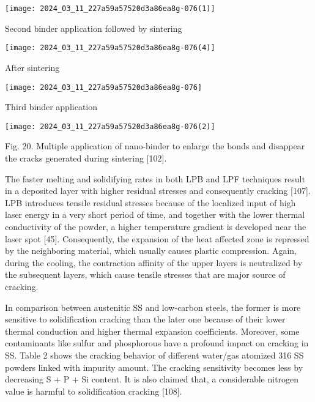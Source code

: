 \documentclass[10pt]{article}
\begin{document}
\begin{center}
\texttt{[image: 2024\_03\_11\_227a59a57520d3a86ea8g-076(1)]}
\end{center}

Second binder application followed by sintering

\begin{center}
\texttt{[image: 2024\_03\_11\_227a59a57520d3a86ea8g-076(4)]}
\end{center}

After sintering

\begin{center}
\texttt{[image: 2024\_03\_11\_227a59a57520d3a86ea8g-076]}
\end{center}

Third binder application

\begin{center}
\texttt{[image: 2024\_03\_11\_227a59a57520d3a86ea8g-076(2)]}
\end{center}

Fig. 20. Multiple application of nano-binder to enlarge the bonds and disappear the cracks generated during sintering [102].

The faster melting and solidifying rates in both LPB and LPF techniques result in a deposited layer with higher residual stresses and consequently cracking [107]. LPB introduces tensile residual stresses because of the localized input of high laser energy in a very short period of time, and together with the lower thermal conductivity of the powder, a higher temperature gradient is developed near the laser spot [45]. Consequently, the expansion of the heat affected zone is repressed by the neighboring material, which usually causes plastic compression. Again, during the cooling, the contraction affinity of the upper layers is neutralized by the subsequent layers, which cause tensile stresses that are major source of cracking.

In comparison between austenitic SS and low-carbon steels, the former is more sensitive to solidification cracking than the later one because of their lower thermal conduction and higher thermal expansion coefficients. Moreover, some contaminants like sulfur and phosphorous have a profound impact on cracking in SS. Table 2 shows the cracking behavior of different water/gas atomized 316 SS powders linked with impurity amount. The cracking sensitivity becomes less by decreasing S + P + Si content. It is also claimed that, a considerable nitrogen value is harmful to solidification cracking [108].
\end{document}
